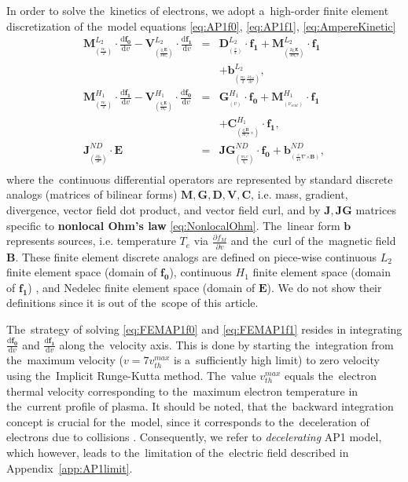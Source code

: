 \documentclass[
 aps,
 jmp,
 amsmath,amssymb,
 twocolumn,
]{revtex4-1}
\newcommand{\appref}[1]{Appendix~\ref{#1}}
\newcommand{\pdv}[2]{\frac{\partial{#1}}{\partial{#2}}}
\newcommand{\vect}[1]{\boldsymbol{#1}}
\newcommand{\matr}[1]{\mathbf{#1}}
\newcommand{\dI}{\text{d}}
\newcommand{\odv}[2]{\frac{\dI #1}{\dI #2}}
\newcommand{\ddv}[2]{\odv{#1}{#2}}
\newcommand{\nue}{\nu_{e}}
\newcommand{\nuscat}{\nu_{scat}}
\newcommand{\vmag}{v}
\newcommand{\vth}{v_{th}}
\newcommand{\E}{\vect{E}}
\newcommand{\B}{\vect{B}}
\newcommand{\qe}{q_e}
\newcommand{\me}{m_e}
\newcommand{\Te}{T_e}
\newcommand{\fM}{f_M}
\newcommand{\fzero}{f_0}
\newcommand{\vfzero}{\vect{f_0}}
\newcommand{\fone}{{\vect{f_1}}}
\begin{document}
In order to solve the~kinetics of electrons, we adopt a~high-order 
finite element discretization 
\cite{Dobrev_Kolev_Rieben-High-order_curvilinear_finite_element_methods_for_Lagrangian_hydrodynamics, mfem-library} 
of the~model equations \eqref{eq:AP1f0}, \eqref{eq:AP1f1}, 
\eqref{eq:AmpereKinetic}
\begin{eqnarray}
  \matr{M}^{L_2}_{_{(\frac{\vmag\nue}{2})}}\cdot\ddv{\vfzero}{\vmag} 
  - \matr{V}^{L_2}_{_{(\frac{\qe\E}{3\me})}}\cdot\ddv{\fone}{\vmag}
  &=&
  \matr{D}^{L_2}_{_{(\frac{\vmag}{3})}}\cdot\fone 
  + \matr{M}^{L_2}_{_{(\frac{2\qe\E}{3\me\vmag})}}\cdot\fone
  \nonumber \\ 
  &&+ \vect{b}^{L_2}_{_{(\frac{\vmag\nue}{2}\pdv{\fM}{\vmag})}}, 
  \label{eq:FEMAP1f0}
  \\
  \matr{M}^{H_1}_{_{(\frac{\vmag\nue}{2})}}\cdot\ddv{\fone}{\vmag}
  - \matr{V}^{H_1}_{_{(\frac{\qe\E}{\me})}}\cdot\ddv{\vfzero}{\vmag}
   &=& 
  \matr{G}^{H_1}_{_{(\vmag)}}\cdot\vfzero 
  + \matr{M}^{H_1}_{_{(\nuscat)}}\cdot\fone 
  \nonumber \\
  && + \matr{C}^{H_1}_{_{(\frac{\qe\B}{\me c}\vect{\times})}}\cdot\fone
  ,
  \label{eq:FEMAP1f1}\\
  \matr{J}^{ND}_{_{(\pdv{\fzero}{\vmag})}}\cdot\E 
  &=& 
  \matr{JG}^{ND}_{_{(\frac{\me\vmag}{\qe})}}\cdot\vfzero
  + \vect{b}^{ND}_{_{(\frac{c}{4\pi} \nabla\vect{\times}\B)}} 
  ,
  \nonumber \\
  \label{eq:FEMAmpereKinetic}
\end{eqnarray}
where the~continuous differential operators are represented by standard 
discrete analogs (matrices of bilinear forms) 
$\matr{M}, \matr{G}, \matr{D}, \matr{V}, \matr{C}$, i.e. mass, gradient, 
divergence, vector field dot product, and vector field curl, and
by $\matr{J}, \matr{JG}$ matrices specific to {\bf nonlocal Ohm's law} 
\eqref{eq:NonlocalOhm}. The~linear form $\vect{b}$ represents sources, i.e.
temperature $\Te$ via $\pdv{\fM}{\vmag}$ and the~curl of 
the~magnetic field $\B$. These finite element discrete analogs are defined
on piece-wise continuous $L_2$ finite element space (domain of $\vfzero$),
continuous $H_1$ finite element space (domain of $\fone$) 
\cite{Dobrev_Kolev_Rieben-High-order_curvilinear_finite_element_methods_for_Lagrangian_hydrodynamics}, 
and Nedelec finite element space (domain of $\E$). We do not show their
definitions since it is out of the~scope of this article. 

The~strategy of solving 
\eqref{eq:FEMAP1f0} and \eqref{eq:FEMAP1f1} resides in integrating 
$\ddv{\vfzero}{\vmag}$
and $\ddv{\fone}{\vmag}$ along the~velocity axis. 
This is done by starting the~integration
from the~maximum  velocity 
($\vmag = 7 \vth^{max}$ is a~sufficiently high limit) 
to zero velocity using the~Implicit Runge-Kutta method. The~value
$\vth^{max}$ equals the~electron thermal velocity corresponding to the~maximum 
electron temperature in the~current profile of plasma.
It should be noted, that the~backward integration concept is crucial for 
the~model, since it corresponds to the~deceleration of electrons due to 
collisions \cite{Touati_2014}. Consequently, we refer to 
\textit{decelerating} AP1 model, which however, leads to the~limitation of 
the~electric field described in \appref{app:AP1limit}. 
\end{document}
